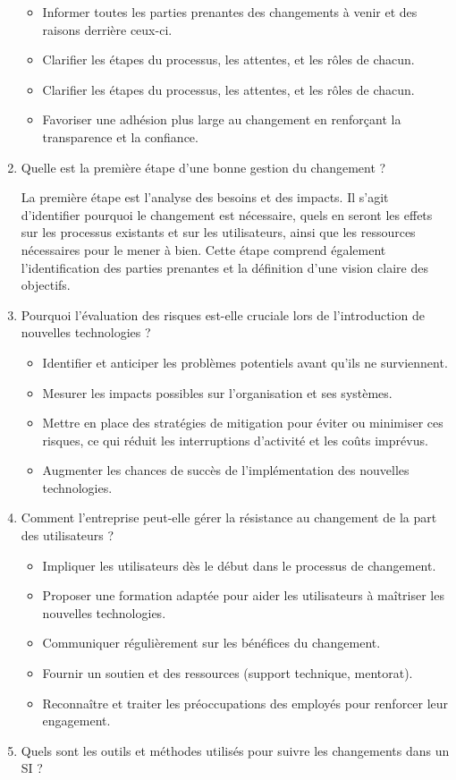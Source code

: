 \begin{enumerate}
        \begin{itemize}
            \item Informer toutes les parties prenantes des changements à venir et des raisons derrière ceux-ci.
            \item Clarifier les étapes du processus, les attentes, et les rôles de chacun.
            \item Clarifier les étapes du processus, les attentes, et les rôles de chacun.
            \item Favoriser une adhésion plus large au changement en renforçant la transparence et la confiance.
        \end{itemize}
    \item Quelle est la première étape d’une bonne gestion du changement ?

        La première étape est l'analyse des besoins et des impacts. Il s'agit d'identifier pourquoi le changement est nécessaire, quels en seront les effets sur les processus existants et sur les utilisateurs, ainsi que les ressources nécessaires pour le mener à bien. Cette étape comprend également l'identification des parties prenantes et la définition d'une vision claire des objectifs.
    \item Pourquoi l’évaluation des risques est-elle cruciale lors de l’introduction de nouvelles technologies ?

        \begin{itemize}
            \item Identifier et anticiper les problèmes potentiels avant qu’ils ne surviennent.
            \item Mesurer les impacts possibles sur l'organisation et ses systèmes.
            \item Mettre en place des stratégies de mitigation pour éviter ou minimiser ces risques, ce qui réduit les interruptions d'activité et les coûts imprévus.
            \item Augmenter les chances de succès de l'implémentation des nouvelles technologies.
        \end{itemize}
    \item Comment l’entreprise peut-elle gérer la résistance au changement de la part des utilisateurs ?

        \begin{itemize}
            \item Impliquer les utilisateurs dès le début dans le processus de changement.
            \item Proposer une formation adaptée pour aider les utilisateurs à maîtriser les nouvelles technologies.
            \item Communiquer régulièrement sur les bénéfices du changement.
            \item Fournir un soutien et des ressources (support technique, mentorat).
            \item Reconnaître et traiter les préoccupations des employés pour renforcer leur engagement.
        \end{itemize}
    \item Quels sont les outils et méthodes utilisés pour suivre les changements dans un SI ?


\end{enumerate}
